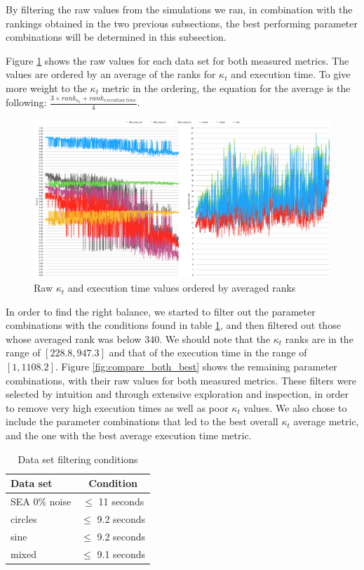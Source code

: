 By filtering the raw values from the simulations we ran, in combination with the rankings obtained in the two previous subsections, the best performing parameter combinations will be determined in this subsection.

Figure \ref{fig:rank_both_all} shows the raw values for each data set for both measured metrics. The values are ordered by an average of the ranks for $\kappa_t$ and execution time. To give more weight to the $\kappa_t$ metric in the ordering, the equation for the average is the following: $\frac{3\times rank_{\kappa_t}+rank_{execution\ time}}{4}$.

\begin{figure}
  \includegraphics[width=\linewidth]{./images/chapter5/rank_both}
\caption{\label{fig:rank_both_all}Raw $\kappa_t$ and execution time values ordered by averaged ranks}
\end{figure}

In order to find the right balance, we started to filter out the parameter combinations with the conditions found in table \ref{table:rank_both_filter_dataset}, and then filtered out those whose averaged rank was below 340. We should note that the $\kappa_t$ ranks are in the range of $[228.8, 947.3]$ and that of the execution time in the range of $[1, 1108.2]$. Figure \ref{fig:compare_both_best} shows the remaining parameter combinations, with their raw values for both measured metrics. These filters were selected by intuition and through extensive exploration and inspection, in order to remove very high execution times as well as poor $\kappa_t$ values. We also chose to include the parameter combinations that led to the best overall $\kappa_t$ average metric, and the one with the best average execution time metric.

\begin{table}[]
\centering
\caption{\label{table:rank_both_filter_dataset}Data set filtering conditions}
\begin{tabular}{|l|c|} 
\hline
\textbf{Data set} & \textbf{Condition} \\ \hline \hhline{==}
SEA $0\%$ noise & $\le$ 11 seconds \\ \hline
circles & $\le$ 9.2 seconds \\ \hline
sine & $\le$ 9.2 seconds \\ \hline
mixed & $\le$ 9.1 seconds \\ \hline
\end{tabular}
\end{table}

